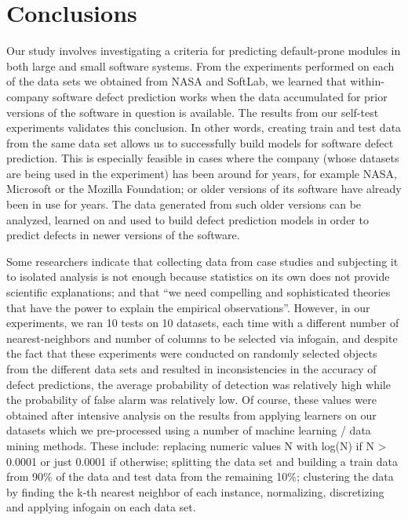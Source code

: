 \documentclass{sig-alternate}
\begin{document}
\section{Conclusions}
Our study involves investigating a criteria for predicting default-prone modules in both large and small software systems. From the experiments performed on each of the data sets we obtained from NASA and SoftLab, we learned that within-company software defect prediction works when the data accumulated for prior versions of the software in question is available. The results from our self-test experiments validates this conclusion. In other words, creating train and test data from the same data set allows us to successfully build models for software defect prediction. This is especially feasible in cases where the company (whose datasets are being used in the experiment) has been around for years, for example NASA, Microsoft or the Mozilla Foundation; or older versions of its software have already been in use for years. The data generated from such older versions can be analyzed, learned on and used to build defect prediction models in order to predict defects in newer versions of the software.

Some researchers indicate that collecting data from case studies and subjecting it to isolated analysis is not enough because statistics on its own does not provide scientific explanations; and that ``we need compelling and sophisticated theories that have the power to explain the empirical observations''\cite{critique}. However, in our experiments, we ran 10 tests on 10 datasets, each time with a different number of nearest-neighbors and number of columns to be selected via infogain, and despite the fact that these experiments were conducted on randomly selected objects from the different data sets and resulted in inconsistencies in the accuracy of defect predictions, the average probability of detection was relatively high while the probability of false alarm was relatively low. Of course, these values were obtained after intensive analysis on the results from applying learners on our datasets which we pre-processed using a number of machine learning / data mining methods. These include: replacing numeric values N with log(N) if N > 0.0001 or just 0.0001 if otherwise; splitting the data set and building a train data from 90\% of the data and test data from the remaining 10\%; clustering the data by finding the k-th nearest neighbor of each instance, normalizing, discretizing and applying infogain on each data set.
\end{document}
